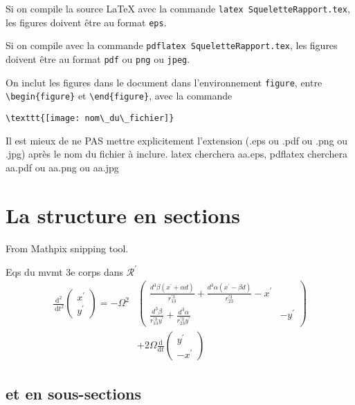 \documentclass[a4paper,12pt,twoside]{article}
\begin{document}
Si on compile la source \LaTeX{} avec la commande 
\verb|latex SqueletteRapport.tex|, 
les figures doivent \^etre au format \verb|eps|.

Si on compile avec la commande
\verb|pdflatex SqueletteRapport.tex|, 
les figures doivent \^etre au format \verb|pdf| ou \verb|png| 
ou \verb|jpeg|.

On inclut les figures dans le document dans l'environnement \verb|figure|, entre \verb|\begin{figure}| et \verb|\end{figure}|, avec la commande 

\verb|\texttt{[image: nom\_du\_fichier]} |

Il est mieux de ne PAS mettre explicitement l'extension (.eps ou .pdf ou .png ou .jpg) après le nom du fichier à inclure. latex cherchera aa.eps, pdflatex cherchera aa.pdf ou  aa.png ou aa.jpg

\section{La structure en sections}
From Mathpix snipping tool.

Eqs du mvmt 3e corps dans $\mathcal{R^\prime}$
$$
\begin{aligned}
\frac{\mathrm{d}^{2}}{\mathrm{~d} t^{2}}\left(\begin{array}{l}
x^{\prime} \\
y^{\prime}
\end{array}\right)=-\Omega^{2} &\left(\begin{array}{ll}
\frac{d^{3} \beta\left(x^{\prime}+\alpha d\right)}{r_{13}^{\prime 3}}+\frac{d^{3} \alpha\left(x^{\prime}-\beta d\right)}{r_{23}^{\prime 3}}-x^{\prime} \\
\frac{d^{3} \beta}{r_{13}^{\prime 3} y^{\prime}}+\frac{d^{3} \alpha}{r_{23}^{\prime 3} y^{\prime}} & -y^{\prime}
\end{array}\right) \\
&+2 \Omega \frac{\mathrm{d}}{\mathrm{d} t}\left(\begin{array}{c}
y^{\prime} \\
-x^{\prime}
\end{array}\right)
\end{aligned}
$$

\subsection{et en sous-sections}
\end{document}
